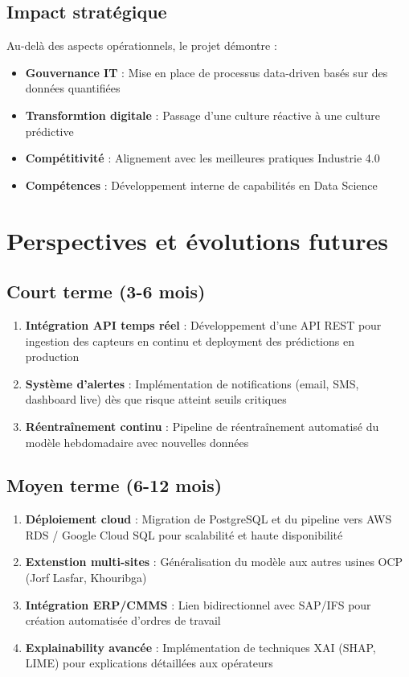 \documentclass[a4paper,12pt,twoside]{report}
\begin{document}
\subsection{Impact stratégique}

Au-delà des aspects opérationnels, le projet démontre :

\begin{itemize}
    \item \textbf{Gouvernance IT} : Mise en place de processus data-driven basés sur des données quantifiées
    \item \textbf{Transformtion digitale} : Passage d'une culture réactive à une culture prédictive
    \item \textbf{Compétitivité} : Alignement avec les meilleures pratiques Industrie 4.0
    \item \textbf{Compétences} : Développement interne de capabilités en Data Science
\end{itemize}

\section{Perspectives et évolutions futures}

\subsection{Court terme (3-6 mois)}

\begin{enumerate}
    \item \textbf{Intégration API temps réel} : Développement d'une API REST pour ingestion des capteurs en continu et deployment des prédictions en production
    \item \textbf{Système d'alertes} : Implémentation de notifications (email, SMS, dashboard live) dès que risque atteint seuils critiques
    \item \textbf{Réentraînement continu} : Pipeline de réentraînement automatisé du modèle hebdomadaire avec nouvelles données
\end{enumerate}

\subsection{Moyen terme (6-12 mois)}

\begin{enumerate}
    \item \textbf{Déploiement cloud} : Migration de PostgreSQL et du pipeline vers AWS RDS / Google Cloud SQL pour scalabilité et haute disponibilité
    \item \textbf{Extenstion multi-sites} : Généralisation du modèle aux autres usines OCP (Jorf Lasfar, Khouribga)
    \item \textbf{Intégration ERP/CMMS} : Lien bidirectionnel avec SAP/IFS pour création automatisée d'ordres de travail
    \item \textbf{Explainability avancée} : Implémentation de techniques XAI (SHAP, LIME) pour explications détaillées aux opérateurs
\end{enumerate}
\end{document}
